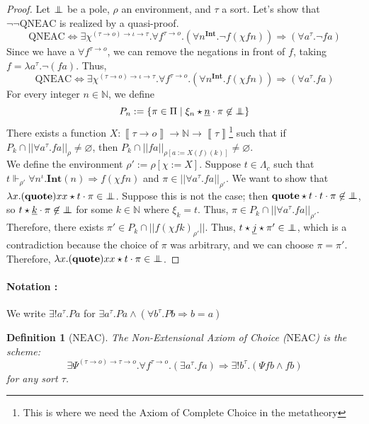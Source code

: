 \documentclass[a4paper,12pt]{article}
\newtheorem{defi}[theo]{Definition}
\theoremstyle{rmqstyle}
\newcommand{\N}{\mathbb{N}}
\newcommand{\set}[1]{\{#1\}}
\newcommand{\abss}[1]{\lvert \lvert#1\rvert \rvert}
\newcommand{\itp}[1]{\left\llbracket#1\right\rrbracket}
\renewcommand{\int}{\mathbf{Int}}
\renewcommand{\implies}{\Rightarrow}
\renewcommand{\iff}{\Leftrightarrow}
\newcommand{\pole}{{\protect\mathpalette{\protect\polehelper}{\bot}}} \def\polehelper#1#2{\mathrel{\rlap{$#1#2$}\mkern3mu{#1#2}}}
\newcommand{\Kri}[1]{\underline{#1}}
\renewcommand{\quote}{\mathbf{quote}}
\newcommand{\QNEAC}{\mathrm{QNEAC}}
\newcommand{\NEAC}{\mathrm{NEAC}}
\begin{document}
\begin{proof}
Let $\pole$ be a pole, $\rho$ an environment, and $\tau$ a sort. Let's show that $\neg \neg \QNEAC$ is realized by a quasi-proof.
$$\QNEAC \iff \exists \chi^{(\tau \to o) \to \iota \to \tau}. \forall f^{\tau \to o}. (\forall n^\int. \neg f(\chi f n)) \implies (\forall a^\tau. \neg fa)$$
Since we have a $\forall f^{\tau \to o}$, we can remove the negations in front of $f$, taking $f = \lambda a^\tau. \neg (fa)$. Thus,
$$\QNEAC \iff \exists \chi^{(\tau \to o) \to \iota \to \tau}. \forall f^{\tau \to o}. (\forall n^\int. f(\chi f n)) \implies (\forall a^\tau. fa)$$
For every integer $n \in \N$, we define
$$P_n := \set{\pi \in \Pi \mid \xi_n \star \Kri{n} \cdot \pi \not \in \pole}$$
There exists a function $X : \itp{\tau \to o} \to \N \to \itp{\tau}$\footnote{This is where we need the Axiom of Complete Choice in the metatheory} such that if $P_k \cap \abss{\forall a^\tau. fa}_\rho \neq \varnothing$, then $P_k \cap \abss{fa}_{\rho[a := X (f) (k)]} \neq \varnothing$.\\
We define the environment $\rho' := \rho[\chi := X]$. Suppose $t \in \Lambda_c$ such that $t \Vdash_{\rho'} \forall n^\iota. \int(n) \implies f(\chi f n)$ and $\pi \in \abss{\forall a^\tau. fa}_{\rho'}$. We want to show that $\lambda x. (\quote) x x \star t \cdot \pi \in \pole$. Suppose this is not the case; then $\quote \star t \cdot t \cdot \pi \not \in \pole$, so $t \star \Kri{k} \cdot \pi \not \in \pole$ for some $k \in \N$ where $\xi_k = t$. Thus, $\pi \in P_k \cap \abss{\forall a^\tau. fa}_{\rho'}$. Therefore, there exists $\pi' \in P_k \cap \abss{f (\chi f k)_{\rho'}}$. Thus, $t \star \Kri{j} \star \pi' \in \pole$, which is a contradiction because the choice of $\pi$ was arbitrary, and we can choose $\pi = \pi'$. Therefore, $\lambda x. (\quote) x x \star t \cdot \pi \in \pole$.
\end{proof}


\paragraph{Notation :} We write $\exists ! a^\tau.Pa$ for $\exists a^\tau. Pa \land (\forall b^\tau. Pb \implies b = a)$

\begin{defi}[$\NEAC$]
The Non-Extensional Axiom of Choice ($\NEAC$) is the scheme:
$$\exists \Psi^{(\tau \to o) \to \tau \to o}. \forall f^{\tau \to o}. (\exists a^\tau. fa) \implies \exists ! b^\tau.(\Psi f b \land f b)$$
for any sort $\tau$.
\end{defi}
\end{document}
